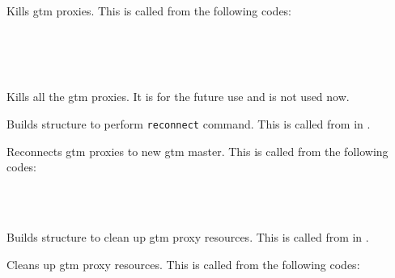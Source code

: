       Kills gtm proxies.
      This is called from the following codes:
      
      \FuncRefHdr
		  \vspace{-10pt} \\ 
		  \vspace{-10pt} \\ 
		  \vspace{-10pt} \\ \hline
      \FuncRefTrailor
  
  
      Kills all the gtm proxies.
      It is for the future use and is not used now.
  
  
      Builds  structure to perform \texttt{reconnect} command.
      This is called from  in .
  
  
      Reconnects gtm proxies to new gtm master.
      This is called from the following codes:
      
      \FuncRefHdr
		  \vspace{-10pt} \\ 
		  \vspace{-10pt} \\ \hline
      \FuncRefTrailor
  
  
      Builds  structure to clean up gtm proxy resources.
      This is called from  in .
  
  
      Cleans up gtm proxy resources.
      This is called from the following codes:
      
      \FuncRefHdr
		  \vspace{-10pt} \\ 
		  \vspace{-10pt} \\ 
		  \vspace{-10pt} \\ \hline
      \FuncRefTrailor
  
